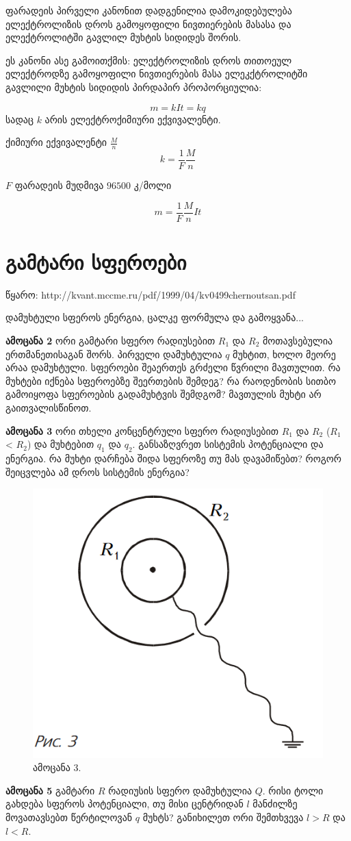 \documentclass[a4paper]{book}
\begin{document}
ფარადეის პირველი კანონით დადგენილია დამოკიდებულება ელექტროლიზის დროს გამოყოფილი ნივთიერების მასასა და ელექტროლიტში გავლილ მუხტის სიდიდეს შორის. 

ეს კანონი ასე გამოითქმის: ელექტროლიზის დროს თითოეულ ელექტროდზე გამოყოფილი ნივთიერების მასა ელეკქტროლიტში გავლილი მუხტის სიდიდის პირდაპირ პროპორციულია:

$$m = kIt = kq$$
სადაც $k$ არის ელექტროქიმიური ექვივალენტი.

ქიმიური ექვივალენტი $\frac{M}{n}$
$$k = \frac{1}{F}\frac{M}{n}$$

$F$ ფარადეის მუდმივა $96500$ კ/მოლი

$$m = \frac{1}{F}\frac{M}{n}It$$

\section{გამტარი სფეროები}
წყარო: http://kvant.mccme.ru/pdf/1999/04/kv0499chernoutsan.pdf


დამუხტული სფეროს ენერგია, ცალკე ფორმულა და გამოყვანა...

\textbf{ამოცანა 2} ორი გამტარი სფერო რადიუსებით $R_1$ და $R_2$ მოთავსებულია ერთმანეთისაგან შორს. პირველი დამუხტულია $q$ მუხტით, ხოლო მეორე არაა დამუხტული. სფეროები შეაერთეს გრძელი წვრილი მავთულით. რა მუხტები იქნება სფეროებზე შეერთების შემდეგ? რა რაოდენობის სითბო გამოიყოფა სფეროების გადამუხტვის შემდგომ? მავთულის მუხტი არ გაითვალისწინოთ.

\textbf{ამოცანა 3} ორი თხელი კონცენტრული სფერო რადიუსებით $R_1$ და $R_2$ ($R_1$ < $R_2$) და მუხტებით $q_1$ და $q_2$. განსაზღვრეთ სისტემის პოტენციალი და ენერგია. რა მუხტი დარჩება შიდა სფეროზე თუ მას დავამიწებთ? როგორ შეიცვლება ამ დროს სისტემის ენერგია?
	\begin{figure}[H]
		\centering
		\includegraphics[width=0.3\columnwidth]{figures/Screenshot 2022-11-09 154913}
		\caption{ამოცანა 3.}
		\label{fig:problem_3}
	\end{figure}

\textbf{ამოცანა 5} გამტარი $R$ რადიუსის სფერო დამუხტულია $Q$. რისი ტოლი გახდება სფეროს პოტენციალი, თუ მისი ცენტრიდან $l$ მანძილზე მოვათავსებთ წერტილოვან $q$ მუხტს? განიხილეთ ორი შემთხვევა $l > R$ და $l < R$.
\end{document}
